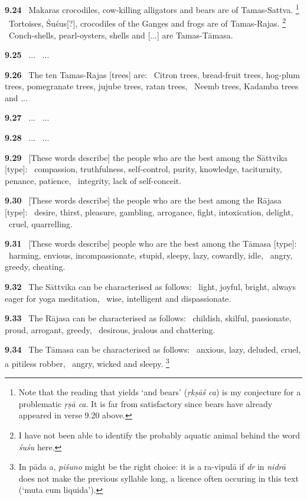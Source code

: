 \documentclass{article}
\newcommand{\skt}[1]{\textit{#1}}
\begin{document}
\textbf{9.24}%
\ Makaras crocodiles, cow-killing alligators and bears are of Tamas-Sattva.%
\footnote{Note that the reading that yields `and bears' (\skt{ṛkṣāś ca}) is my conjecture                        for a problematic \skt{ṛṣā ca}. It is far from satisfactory since bears have already appeared in                         verse 9.20 above. }%
\ Tortoises, Śuśus[?], crocodiles of the Ganges and frogs are of Tamas-Rajas.%
\footnote{I have not been able to identify the probably aquatic animal behind the                         word \skt{śuśu} here. }%
\ Conch-shells, pearl-oysters, shells and [...] are Tamas-Tāmasa.%


\textbf{9.25}%
\ ...%
\ ...%


\textbf{9.26}%
\ The ten Tamas-Rajas [trees] are:%
\                 Citron trees, bread-fruit trees, hog-plum trees, pomegranate trees, jujube trees, ratan trees,%
\ Neemb trees, Kadamba trees and ...%


\textbf{9.27}%
\ ...%
\ ...%


\textbf{9.28}%
\ ...%
\ ...%


\textbf{9.29}%
\ [These words describe] the people who are the best among the Sāttvika [type]:%
\                compassion, truthfulness, self-control, purity, knowledge, taciturnity, penance, patience,%
\ integrity, lack of self-conceit.%


\textbf{9.30}%
\ [These words describe] the people who are the best among the Rājasa [type]:%
\                   desire, thirst, pleasure, gambling, arrogance, fight, intoxication, delight,%
\ cruel, quarrelling.%


\textbf{9.31}%
\ [These words describe] people who are the best among the Tāmasa [type]:%
\                 harming, envious, incompassionate, stupid, sleepy, lazy, cowardly, idle,%
\ angry, greedy, cheating.%


\textbf{9.32}%
\ The Sāttvika can be characterised as follows:%
\               light, joyful, bright, always eager for yoga meditation,%
\ wise, intelligent and dispassionate.%


\textbf{9.33}%
\ The Rājasa can be characterised as follows:%
\               childish, skilful, passionate, proud, arrogant, greedy,%
\ desirous, jealous and chattering.%


\textbf{9.34}%
\ The Tāmasa can be characterised as follows:%
\                 anxious, lazy, deluded, cruel, a pitiless robber,%
\ angry, wicked and sleepy.%
\footnote{In pāda a, \skt{piśuno} might be the right choice: it is a ra-vipulā                         if \skt{dr} in \skt{nidrā} does not make the previous syllable long, a licence                        often occuring in this text (`muta cum liquida'). }%
\end{document}
